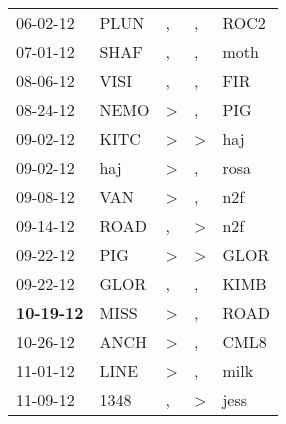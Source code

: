 \begin{supertabular}{p{0.07\textwidth}p{0.06\textwidth}p{0.02\textwidth}p{0.02\textwidth}p{0.06\textwidth}}
          06-02-12\textsuperscript{} &           PLUN\textsuperscript{} &                , &                , &           ROC2\textsuperscript{} \\
          07-01-12\textsuperscript{} &           SHAF\textsuperscript{} &                , &                , &           moth\textsuperscript{} \\
          08-06-12\textsuperscript{} &           VISI\textsuperscript{} &                , &                , &            FIR\textsuperscript{} \\
          08-24-12\textsuperscript{} &           NEMO\textsuperscript{} &     \textgreater &                , &            PIG\textsuperscript{} \\
          09-02-12\textsuperscript{} &           KITC\textsuperscript{} &     \textgreater &     \textgreater &            haj\textsuperscript{} \\
          09-02-12\textsuperscript{} &            haj\textsuperscript{} &     \textgreater &                , &           rosa\textsuperscript{} \\
          09-08-12\textsuperscript{} &            VAN\textsuperscript{} &     \textgreater &                , &            n2f\textsuperscript{} \\
          09-14-12\textsuperscript{} &           ROAD\textsuperscript{} &                , &     \textgreater &            n2f\textsuperscript{} \\
          09-22-12\textsuperscript{} &            PIG\textsuperscript{} &     \textgreater &     \textgreater &           GLOR\textsuperscript{} \\
          09-22-12\textsuperscript{} &           GLOR\textsuperscript{} &                , &                , &           KIMB\textsuperscript{} \\
 \textbf{10-19-12\textsuperscript{}} &           MISS\textsuperscript{} &     \textgreater &                , &           ROAD\textsuperscript{} \\
          10-26-12\textsuperscript{} &           ANCH\textsuperscript{} &     \textgreater &                , &           CML8\textsuperscript{} \\
          11-01-12\textsuperscript{} &           LINE\textsuperscript{} &     \textgreater &                , &           milk\textsuperscript{} \\
          11-09-12\textsuperscript{} &           1348\textsuperscript{} &                , &     \textgreater &           jess\textsuperscript{} \\

\end{supertabular}
